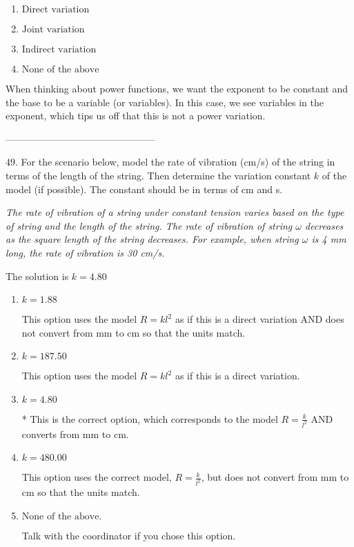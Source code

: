 \documentclass{article}[14pt]
\begin{document}
\begin{enumerate}[label=\Alph*.] 
\item $ \text{Direct variation} $ 

  
\item $ \text{Joint variation} $ 

  
\item $ \text{Indirect variation} $ 

  
\item $ \text{None of the above} $ 

  
\end{enumerate} 
 
When thinking about power functions, we want the exponent to be constant and the base to be a variable (or variables). In this case, we see variables in the exponent, which tips us off that this is not a power variation.

-----------------------------------------------

49. For the scenario below, model the rate of vibration (cm/s) of the string in terms of the length of the string. Then determine the variation constant $k$ of the model (if possible). The constant should be in terms of cm and s.
\begin{center} \textit{The rate of vibration of a string under constant tension varies based on the type of string and the length of the string. The rate of vibration of string $\omega$ decreases as the square length of the string decreases. For example, when string $\omega$ is 4 mm long, the rate of vibration is 30 cm/s.} \end{center} 
The solution is $ k = 4.80 $ 

\begin{enumerate}[label=\Alph*.] 
\item $ k = 1.88 $ 

 This option uses the model $R = kl^{2}$ as if this is a direct variation AND does not convert from mm to cm so that the units match. 
\item $ k = 187.50 $ 

 This option uses the model $R = kl^{2}$ as if this is a direct variation. 
\item $ k = 4.80 $ 

 * This is the correct option, which corresponds to the model $R = \frac{k}{l^{2}}$ AND converts from mm to cm. 
\item $ k = 480.00 $ 

 This option uses the correct model, $R = \frac{k}{l^{2}}$, but does not convert from mm to cm so that the units match. 
\item $ \text{None of the above.} $ 

 Talk with the coordinator if you chose this option. 
\end{enumerate} 
 
\end{document}
